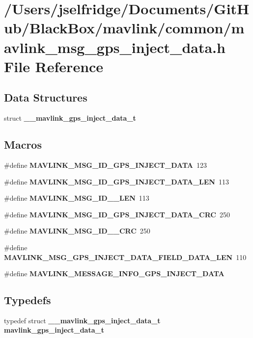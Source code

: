\section{/\+Users/jselfridge/\+Documents/\+Git\+Hub/\+Black\+Box/mavlink/common/mavlink\+\_\+msg\+\_\+gps\+\_\+inject\+\_\+data.h File Reference}
\label{mavlink__msg__gps__inject__data_8h}
\subsection*{Data Structures}
\begin{DoxyCompactItemize}
\item 
struct \textbf{ \+\_\+\+\_\+mavlink\+\_\+gps\+\_\+inject\+\_\+data\+\_\+t}
\end{DoxyCompactItemize}
\subsection*{Macros}
\begin{DoxyCompactItemize}
\item 
\#define \textbf{ M\+A\+V\+L\+I\+N\+K\+\_\+\+M\+S\+G\+\_\+\+I\+D\+\_\+\+G\+P\+S\+\_\+\+I\+N\+J\+E\+C\+T\+\_\+\+D\+A\+TA}~123
\item 
\#define \textbf{ M\+A\+V\+L\+I\+N\+K\+\_\+\+M\+S\+G\+\_\+\+I\+D\+\_\+\+G\+P\+S\+\_\+\+I\+N\+J\+E\+C\+T\+\_\+\+D\+A\+T\+A\+\_\+\+L\+EN}~113
\item 
\#define \textbf{ M\+A\+V\+L\+I\+N\+K\+\_\+\+M\+S\+G\+\_\+\+I\+D\+\_\+\_\+\+L\+EN}~113
\item 
\#define \textbf{ M\+A\+V\+L\+I\+N\+K\+\_\+\+M\+S\+G\+\_\+\+I\+D\+\_\+\+G\+P\+S\+\_\+\+I\+N\+J\+E\+C\+T\+\_\+\+D\+A\+T\+A\+\_\+\+C\+RC}~250
\item 
\#define \textbf{ M\+A\+V\+L\+I\+N\+K\+\_\+\+M\+S\+G\+\_\+\+I\+D\+\_\+\_\+\+C\+RC}~250
\item 
\#define \textbf{ M\+A\+V\+L\+I\+N\+K\+\_\+\+M\+S\+G\+\_\+\+G\+P\+S\+\_\+\+I\+N\+J\+E\+C\+T\+\_\+\+D\+A\+T\+A\+\_\+\+F\+I\+E\+L\+D\+\_\+\+D\+A\+T\+A\+\_\+\+L\+EN}~110
\item 
\#define \textbf{ M\+A\+V\+L\+I\+N\+K\+\_\+\+M\+E\+S\+S\+A\+G\+E\+\_\+\+I\+N\+F\+O\+\_\+\+G\+P\+S\+\_\+\+I\+N\+J\+E\+C\+T\+\_\+\+D\+A\+TA}
\end{DoxyCompactItemize}
\subsection*{Typedefs}
\begin{DoxyCompactItemize}
\item 
typedef struct \textbf{ \+\_\+\+\_\+mavlink\+\_\+gps\+\_\+inject\+\_\+data\+\_\+t} \textbf{ mavlink\+\_\+gps\+\_\+inject\+\_\+data\+\_\+t}
\end{DoxyCompactItemize}


